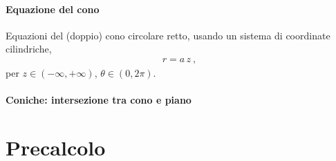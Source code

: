\documentclass[letterpaper,10pt,english]{jupyterBook}
\begin{document}
\subsection{Equazione del cono}
\label{\detokenize{ch/analytic_geometry/analytic_geometry_3d/cone:equazione-del-cono}}
\sphinxAtStartPar
Equazioni del (doppio) cono circolare retto, usando un sistema di coordinate cilindriche,
\begin{equation*}
\begin{split}r = a \, z \ ,\end{split}
\end{equation*}
\sphinxAtStartPar
per \(z \in (-\infty, +\infty)\), \(\theta \in (0, 2 \pi)\).


\subsection{Coniche: intersezione tra cono e piano}
\label{\detokenize{ch/analytic_geometry/analytic_geometry_3d/cone:coniche-intersezione-tra-cono-e-piano}}\label{\detokenize{ch/analytic_geometry/analytic_geometry_3d/cone:geometry-analytic-3d-cone-conics}}
\sphinxstepscope


\part{Precalcolo}

\sphinxstepscope
\end{document}
